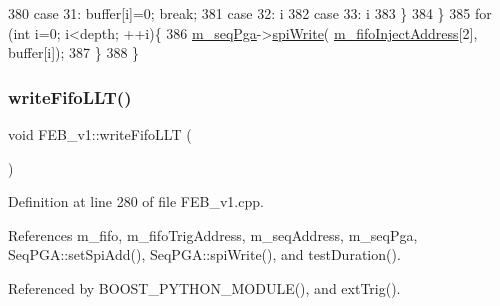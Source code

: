 \begin{DoxyCode}
380     \textcolor{keywordflow}{case} 31:  buffer[i]=0; \textcolor{keywordflow}{break};
381     \textcolor{keywordflow}{case} 32:  i%
382     \textcolor{keywordflow}{case} 33:  i%
383     \}
384    \}  
385   \textcolor{keywordflow}{for} (\textcolor{keywordtype}{int} i=0; i<depth; ++i)\{
386     \hyperlink{classFEB__v1_a6c7804ac86796f233a8393043adf2e77}{m\_seqPga}->\hyperlink{classSeqPGA_ad4421841ce4ce8b88ad13f63216f0743}{spiWrite}( \hyperlink{classFEB__v1_afd035f292061e1823ed64471bb0228ef}{m\_fifoInjectAddress}[2], buffer[i]);
387   \}
388 \}
\end{DoxyCode}
\mbox{\label{classFEB__v1_a0e88b14453100c97b5962e8a6b0f48bf}} 
\subsubsection{\texorpdfstring{write\+Fifo\+L\+L\+T()}{writeFifoLLT()}}
{\footnotesize\ttfamily void F\+E\+B\+\_\+v1\+::write\+Fifo\+L\+LT (\begin{DoxyParamCaption}{ }\end{DoxyParamCaption})}



Definition at line 280 of file F\+E\+B\+\_\+v1.\+cpp.



References m\+\_\+fifo, m\+\_\+fifo\+Trig\+Address, m\+\_\+seq\+Address, m\+\_\+seq\+Pga, Seq\+P\+G\+A\+::set\+Spi\+Add(), Seq\+P\+G\+A\+::spi\+Write(), and test\+Duration().



Referenced by B\+O\+O\+S\+T\+\_\+\+P\+Y\+T\+H\+O\+N\+\_\+\+M\+O\+D\+U\+L\+E(), and ext\+Trig().


